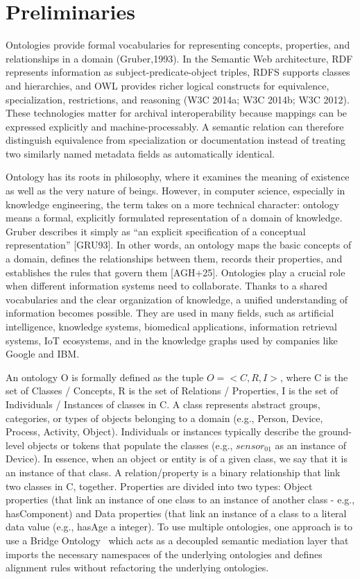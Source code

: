\documentclass[runningheads]{llncs}
\begin{document}
	\section{Preliminaries}
	\label{sec:preliminaries}
	Ontologies provide formal vocabularies for representing concepts, properties, and relationships in a domain (Gruber,1993). In the Semantic Web architecture, RDF represents information as subject-predicate-object triples, RDFS supports classes and hierarchies, and OWL provides richer logical constructs for equivalence, specialization, restrictions, and reasoning (W3C 2014a; W3C 2014b; W3C 2012). These technologies matter for archival interoperability because mappings can be expressed explicitly and machine-processably. A semantic relation can therefore distinguish equivalence from specialization or documentation instead of treating two similarly named metadata fields as automatically identical.
	
	Ontology has its roots in philosophy, where it examines the meaning of existence as well as the very nature of beings. However, in computer science, especially in knowledge engineering, the term takes on a more technical character: ontology means a formal, explicitly formulated representation of a domain of knowledge. Gruber describes it simply as “an explicit specification of a conceptual representation” [GRU93]. In other words, an ontology maps the basic concepts of a domain, defines the relationships between them, records their properties, and establishes the rules that govern them [AGH+25]. Ontologies play a crucial role when different information systems need to collaborate. Thanks to a shared vocabularies and the clear organization of knowledge, a unified understanding of information becomes possible. They are used in many fields, such as artificial intelligence, knowledge systems, biomedical applications, information retrieval systems, IoT ecosystems, and in the knowledge graphs used by companies like Google and IBM.
	
	An ontology O is formally defined as the tuple $O=<C, R, I>$, where C is the set of Classes / Concepts, R is the set of Relations / Properties, I is the set of Individuals / Instances of classes in C. A class represents abstract groups, categories, or types of objects belonging to a domain (e.g., Person, Device, Process, Activity, Object). Individuals or instances typically describe the ground-level objects or tokens that populate the classes (e.g., $sensor_01$ as an instance of Device). In essence, when an object or entity is of a given class, we say that it is an instance of that class. A relation/property is a binary relationship that link two classes in C, together. Properties are divided into two types: Object properties (that link an instance of one class to an instance of another class - e.g., hasComponent) and Data properties (that link an instance of a class to a literal data value (e.g., hasAge a integer). To use multiple ontologies, one approach is to use a Bridge Ontology~\cite{kalfoglou2003ontology} which acts as a decoupled semantic mediation layer that imports the necessary namespaces of the underlying ontologies and defines alignment rules without refactoring the underlying ontologies.
	
\end{document}
